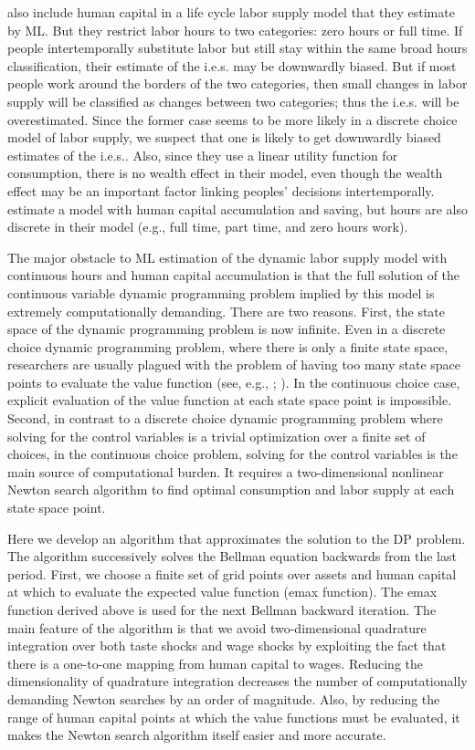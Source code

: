 \documentclass{article}
\begin{document}
\cite{Eckstein1989-ji} also include human capital in a life cycle labor supply model that they estimate by ML. But they restrict labor hours to two categories: zero hours or full time. If people intertemporally substitute labor but still stay within the same broad hours classification, their estimate of the i.e.s. may be downwardly biased. But if most people work around the borders of the two categories, then small changes in labor supply will be classified as changes between two categories; thus the i.e.s. will be overestimated. Since the former case seems to be more likely in a discrete choice model of labor supply, we suspect that one is likely to get downwardly biased estimates of the i.e.s.. Also, since they use a linear utility function for consumption, there is no wealth effect in their model, even though the wealth effect may be an important factor linking peoples' decisions intertemporally. \cite{Keane2001-yk} estimate a model with human capital accumulation and saving, but hours are also discrete in their model (e.g., full time, part time, and zero hours work). \par
The major obstacle to ML estimation of the dynamic labor supply model with continuous hours and human capital accumulation is that the full solution of the continuous variable dynamic programming problem implied by this model is extremely computationally demanding. There are two reasons. First, the state space of the dynamic programming problem is now infinite. Even in a discrete choice dynamic programming problem, where there is only a finite state space, researchers are usually plagued with the problem of having too many state space points to evaluate the value function (see, e.g., \cite{Geweke2001-px}; \cite{Keane1994-sm}). In the continuous choice case, explicit evaluation of the value function at each state space point is impossible. Second, in contrast to a discrete choice dynamic programming problem where solving for the control variables is a trivial optimization over a finite set of choices, in the continuous choice problem, solving for the control variables is the main source of computational burden. It requires a two-dimensional nonlinear Newton search algorithm to find optimal consumption and labor supply at each state space point. \par
Here we develop an algorithm that approximates the solution to the DP problem. The algorithm successively solves the Bellman equation backwards from the last period. First, we choose a finite set of grid points over assets and human capital at which to evaluate the expected value function (emax function). The emax function derived above is used for the next Bellman backward iteration. The main feature of the algorithm is that we avoid two-dimensional quadrature integration over both taste shocks and wage shocks by exploiting the fact that there is a one-to-one mapping from human capital to wages. Reducing the dimensionality of quadrature integration decreases the number of computationally demanding Newton searches by an order of magnitude. Also, by reducing the range of human capital points at which the value functions must be evaluated, it makes the Newton search algorithm itself easier and more accurate. \par
\end{document}
